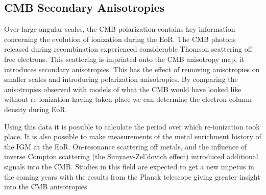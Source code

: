 
\subsection{CMB Secondary Anisotropies} %
\label{sub:cmb_secondary_anisotropies}
	Over large angular scales, the CMB polarization contains key information concerning the evolution of ionization during the EoR. The CMB photons released during recombination experienced considerable Thomson scattering off free electrons. This scattering is imprinted onto the CMB anisotropy map, it introduces secondary anisotropies. This has the effect of removing anisotropies on smaller scales and introducing polarization anisotropies. By comparing the anisotropies observed with models of what the CMB would have looked like without re-ionization having taken place we can determine the electron column density during EoR.

	Using this data it is possible to calculate the period over which re-ionization took place. It is also possible to make measurements of the metal enrichment history of the IGM at the EoR. On-resonance scattering off metals, and the influence of inverse Compton scattering (the Sunyaev-Zel’dovich effect) introduced additional signals into the CMB\cite{Monteagudo2006}. Studies in this field are expected to get a new impetus in the coming years with the results from the Planck telescope giving greater insight into the CMB anisotropies.
